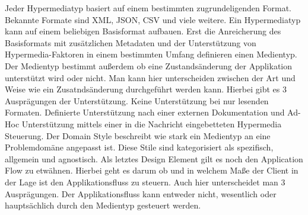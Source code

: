 Jeder Hypermediatyp basiert auf einem bestimmten zugrundeligenden Format. Bekannte Formate sind XML, JSON, CSV und viele weitere. Ein Hypermediatyp kann auf einem beliebigen Basisformat aufbauen. Erst die Anreicherung des Basisformats mit zusätzlichen Metadaten und der Unterstützung von Hypermedia-Faktoren in einem bestimmten Umfang definieren einen Medientyp. Der Medientyp bestimmt außerdem ob eine Zustandsänderung der Applikation unterstützt wird oder nicht. Man kann hier unterscheiden zwischen der Art und Weise wie ein Zusatndsänderung durchgeführt werden kann. Hierbei gibt es 3 Ausprägungen der Unterstützung. Keine Unterstützung bei nur lesenden Formaten. Definierte Unterstützung nach einer externen Dokumentation und Ad-Hoc Unterstützung mittels einer in die Nachricht eingebetteten Hypermedia Steuerung. Der Domain Style beschreibt wie stark ein Medientyp an eine Problemdomäne angepasst ist. Diese Stile sind kategorisiert als spezifisch, allgemein und agnostisch. Als letztes Design Element gilt es noch den Application Flow zu etwähnen. Hierbei geht es darum ob und in welchem Maße der Client in der Lage ist den Applikationsfluss zu steuern. Auch hier unterscheidet man 3 Ausprägungen. Der Applikationsfluss kann entweder nicht, wesentlich oder hauptsächlich durch den Medientyp gesteuert werden.\\


